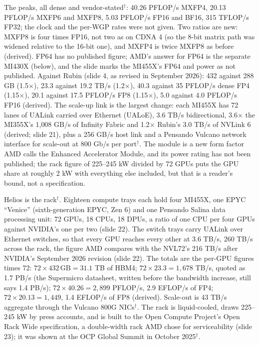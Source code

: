 \documentclass[11pt,letterpaper]{article}
\begin{document}
The peaks, all dense and vendor-stated$^\dagger$: 40.26 PFLOP/s MXFP4, 20.13 PFLOP/s MXFP6 and MXFP8, 5.03 PFLOP/s FP16 and BF16, 315 TFLOP/s FP32; the clock and the per-WGP rates were not given. Two ratios are new: MXFP8 is four times FP16, not two as on CDNA 4 (so the 8-bit matrix path was widened relative to the 16-bit one), and MXFP4 is twice MXFP8 as before (derived). FP64 has no published figure; AMD's answer for FP64 is the separate MI430X (below), and the slide marks the MI455X's FP64 and power as not published. Against Rubin (slide 4, as revised in September 2026): 432 against 288 GB (1.5$\times$), 23.3 against 19.2 TB/s (1.2$\times$), 40.3 against 35 PFLOP/s dense FP4 (1.15$\times$), 20.1 against 17.5 PFLOP/s FP8 (1.15$\times$), 5.0 against 4.0 PFLOP/s FP16 (derived). The scale-up link is the largest change: each MI455X has 72 lanes of UALink carried over Ethernet (UALoE), 3.6 TB/s bidirectional, 3.6$\times$ the MI355X's 1{,}008 GB/s of Infinity Fabric and 1.2$\times$ Rubin's 3.0 TB/s of NVLink 6 (derived; slide 21), plus a 256 GB/s host link and a Pensando Vulcano network interface for scale-out at 800 Gb/s per port$^\dagger$. The module is a new form factor AMD calls the Enhanced Accelerator Module, and its power rating has not been published; the rack figure of 225--245 kW divided by 72 GPUs puts the GPU share at roughly 2 kW with everything else included, but that is a reader's bound, not a specification.

Helios is the rack$^\dagger$. Eighteen compute trays each hold four MI455X, one EPYC ``Venice'' (sixth-generation EPYC, Zen 6) and one Pensando Salina data processing unit: 72 GPUs, 18 CPUs, 18 DPUs, a ratio of one CPU per four GPUs against NVIDIA's one per two (slide 22). The switch trays carry UALink over Ethernet switches, so that every GPU reaches every other at 3.6 TB/s, 260 TB/s across the rack, the figure AMD compares with the NVL72's 216 TB/s after NVIDIA's September 2026 revision (slide 22). The totals are the per-GPU figures times 72: $72 \times 432\,\text{GB} = 31.1$ TB of HBM4; $72 \times 23.3 = 1{,}678$ TB/s, quoted as 1.7 PB/s (the Supermicro datasheet, written before the bandwidth increase, still says 1.4 PB/s); $72 \times 40.26 = 2{,}899$ PFLOP/s, 2.9 EFLOP/s of FP4; $72 \times 20.13 = 1{,}449$, 1.4 EFLOP/s of FP8 (derived). Scale-out is 43 TB/s aggregate through the Vulcano 800G NICs$^\dagger$. The rack is liquid-cooled, draws 225--245 kW by press accounts, and is built to the Open Compute Project's Open Rack Wide specification, a double-width rack AMD chose for serviceability (slide 23); it was shown at the OCP Global Summit in October 2025$^\dagger$.
\end{document}
